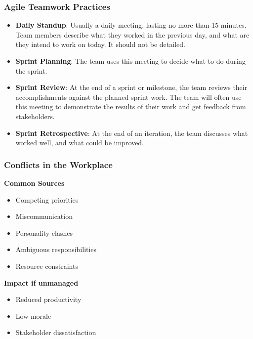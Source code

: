 \subsubsection{Agile Teamwork Practices}

\begin{itemize}
    \item \textbf{Daily Standup}: Usually a daily meeting, lasting no more than 15 minutes. Team members describe what they worked in the previous day, and what are they intend to work on today. It should not be detailed.
    \item \textbf{Sprint Planning}: The team uses this meeting to decide what to do during the sprint.
    \item \textbf{Sprint Review}: At the end of a sprint or milestone, the team reviews their accomplishments against the planned sprint work. The team will often use this meeting to demonstrate the results of their work and get feedback from stakeholders.
    \item \textbf{Sprint Retrospective}: At the end of an iteration, the team discusses what worked well, and what could be improved.
\end{itemize}

\subsubsection{Conflicts in the Workplace}

\indent 

\noindent\textbf{Common Sources}

\begin{itemize}
    \item Competing priorities
    \item Miscommunication
    \item Personality clashes
    \item Ambiguous responsibilities
    \item Resource constraints
\end{itemize}

\bigskip

\noindent\textbf{Impact if unmanaged}

\begin{itemize}
    \item Reduced productivity
    \item Low morale
    \item Stakeholder dissatisfaction
\end{itemize}


